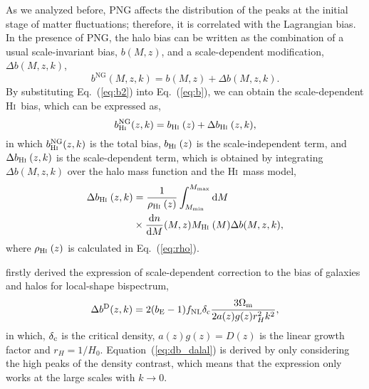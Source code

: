 \documentclass[twocolumn,floatfix,nofootinbib,aps,reprint]{revtex4}
\def\hi{\textsc{Hi~}}
\begin{document}
As we analyzed before, PNG affects the distribution of the peaks at the initial
stage of matter fluctuations; therefore, it is correlated with the Lagrangian bias.
In the presence of PNG, the halo bias can be written 
as the combination of a usual scale-invariant bias, $b(M, z)$, 
and a scale-dependent modification, $\Delta b(M, z, k)$,
\begin{equation}\label{eq:b2}
    b^\mathrm{NG}(M, z, k) = b(M, z) + \Delta b(M, z, k).
\end{equation}
By substituting Eq.~(\ref{eq:b2}) into Eq.~(\ref{eq:b}),
we can obtain the scale-dependent \hi bias, which can be
expressed as,
\begin{equation}\label{eq:bNG}
    b_\mathrm{\hi}^\mathrm{NG}(z, k) = b_\mathrm{\hi}(z) + 
    \Delta b_\mathrm{\hi}(z, k),
\end{equation}
in which $b_\mathrm{\hi}^\mathrm{NG}(z, k)$ is the total bias, $b_\mathrm{\hi}(z)$ is the scale-independent term, and $\Delta b_\mathrm{\hi}(z, k)$ is the scale-dependent term, which is obtained by integrating
$\Delta b(M,z,k)$ over the 
halo mass function and the \hi mass model,
\begin{equation}
    \begin{split}
        \Delta b_\mathrm{\hi}(z, k) &= \frac{1}{\rho_\mathrm{\hi}(z)}
        \int^{M_\mathrm{max}}_{M_\mathrm{min}} \mathrm{d}M \\
        &\times
        \frac{\mathrm{d}n}{\mathrm{d}M}(M, z)
        M_\mathrm{\hi}(M) \Delta b(M, z, k), \label{eq:Delta-b-z-k}
    \end{split}
\end{equation}
where $\rho_\mathrm{\hi}(z)$ is calculated in Eq.~(\ref{eq:rho}).

\citet{2008PhRvD..77l3514D} firstly derived the expression of
scale-dependent correction to the bias of galaxies and halos 
for local-shape bispectrum,
\begin{equation}\label{eq:db_dalal}
    \Delta b^\mathrm{D}(z, k) = 2 (b_\mathrm{E}-1)f_\mathrm{NL}
    \delta_{\rm c} \frac{3\Omega_{\rm m}}{2 a(z) g(z) r_H^2 k^2},
\end{equation}
in which, $\delta_{\rm c}$ is the critical density, $a(z) g(z)=D(z)$
is the linear growth factor and $r_H=1/H_0$.  
Equation~(\ref{eq:db_dalal}) is derived 
by only considering the high peaks of the density contrast, 
which means that the expression only works at the large scales
with $k \rightarrow 0$.
\end{document}
